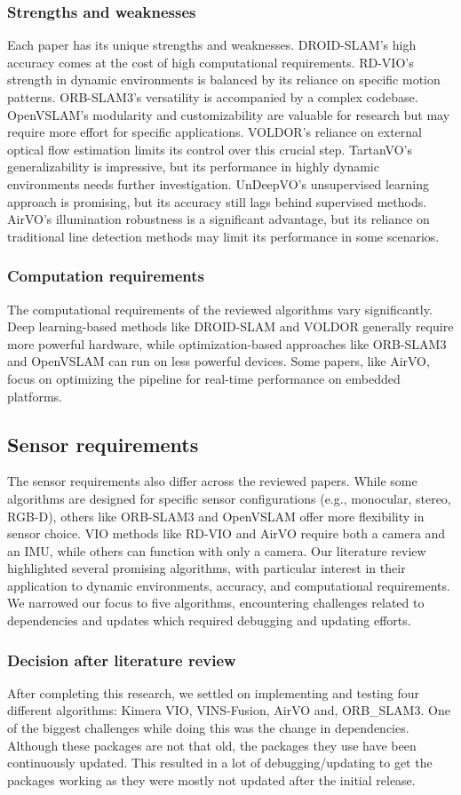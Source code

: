 \documentclass{article}
\begin{document}
\subsubsection*{Strengths and weaknesses}
Each paper has its unique strengths and weaknesses. DROID-SLAM's high accuracy comes at the cost of high computational requirements. RD-VIO's strength in dynamic environments is balanced by its reliance on specific motion patterns. ORB-SLAM3's versatility is accompanied by a complex codebase. OpenVSLAM's modularity and customizability are valuable for research but may require more effort for specific applications. VOLDOR's reliance on external optical flow estimation limits its control over this crucial step. TartanVO's generalizability is impressive, but its performance in highly dynamic environments needs further investigation. UnDeepVO's unsupervised learning approach is promising, but its accuracy still lags behind supervised methods. AirVO's illumination robustness is a significant advantage, but its reliance on traditional line detection methods may limit its performance in some scenarios.
\subsubsection*{Computation requirements}
The computational requirements of the reviewed algorithms vary significantly. Deep learning-based methods like DROID-SLAM and VOLDOR generally require more powerful hardware, while optimization-based approaches like ORB-SLAM3 and OpenVSLAM can run on less powerful devices. Some papers, like AirVO, focus on optimizing the pipeline for real-time performance on embedded platforms.
\subsection*{Sensor requirements}
The sensor requirements also differ across the reviewed papers. While some algorithms are designed for specific sensor configurations (e.g., monocular, stereo, RGB-D), others like ORB-SLAM3 and OpenVSLAM offer more flexibility in sensor choice. VIO methods like RD-VIO and AirVO require both a camera and an IMU, while others can function with only a camera.
Our literature review highlighted several promising algorithms, with particular interest in their application to dynamic environments, accuracy, and computational requirements. We narrowed our focus to five algorithms, encountering challenges related to dependencies and updates which required debugging and updating efforts.
\subsubsection*{Decision after literature review}
After completing this research, we settled on implementing and testing four different algorithms: Kimera VIO, VINS-Fusion, AirVO and, ORB\_SLAM3.
One of the biggest challenges while doing this was the change in dependencies. Although these packages are not that old, the packages they use have been continuously updated. This resulted in a lot of debugging/updating to get the packages working as they were mostly not updated after the initial release.
\end{document}
